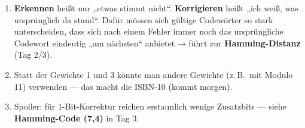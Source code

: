 \begin{enumerate}
\item \textbf{Erkennen} heißt nur „etwas stimmt nicht“. \textbf{Korrigieren}
  heißt „ich weiß, was ursprünglich da stand“. Dafür müssen sich
  gültige Codewörter so stark unterscheiden, dass sich nach einem
  Fehler immer noch das ursprüngliche Codewort eindeutig „am nächsten“
  anbietet → führt zur \textbf{Hamming-Distanz} (Tag 2/3).
\item Statt der Gewichte 1 und 3 könnte man andere Gewichte (z.\,B.\
  mit Modulo 11) verwenden — das macht die ISBN-10 (kommt morgen).
\item Spoiler: für 1-Bit-Korrektur reichen erstaunlich wenige
  Zusatzbits — siehe \textbf{Hamming-Code (7,4)} in Tag 3.
\end{enumerate}
